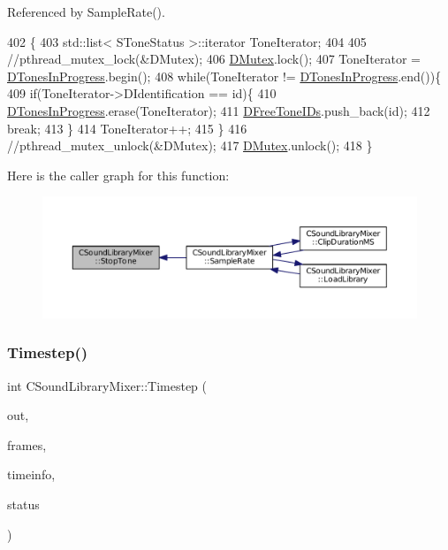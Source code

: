 Referenced by Sample\+Rate().


\begin{DoxyCode}
402                                        \{
403     std::list< SToneStatus >::iterator ToneIterator;
404     
405     \textcolor{comment}{//pthread\_mutex\_lock(&DMutex);}
406     \hyperlink{classCSoundLibraryMixer_a955562a0638df831413a1c6b8860f9fb}{DMutex}.lock();
407     ToneIterator = \hyperlink{classCSoundLibraryMixer_a39bb9c811d842a282b6b7058ac7dfe1c}{DTonesInProgress}.begin();
408     \textcolor{keywordflow}{while}(ToneIterator != \hyperlink{classCSoundLibraryMixer_a39bb9c811d842a282b6b7058ac7dfe1c}{DTonesInProgress}.end())\{
409         \textcolor{keywordflow}{if}(ToneIterator->DIdentification == \textcolor{keywordtype}{id})\{
410             \hyperlink{classCSoundLibraryMixer_a39bb9c811d842a282b6b7058ac7dfe1c}{DTonesInProgress}.erase(ToneIterator);
411             \hyperlink{classCSoundLibraryMixer_a2d1389368651db10fd6fd8b3cd08c164}{DFreeToneIDs}.push\_back(\textcolor{keywordtype}{id});
412             \textcolor{keywordflow}{break};
413         \}
414         ToneIterator++;
415     \}
416     \textcolor{comment}{//pthread\_mutex\_unlock(&DMutex);  }
417     \hyperlink{classCSoundLibraryMixer_a955562a0638df831413a1c6b8860f9fb}{DMutex}.unlock();
418 \}
\end{DoxyCode}
Here is the caller graph for this function\+:\nopagebreak
\begin{figure}[H]
\begin{center}
\leavevmode
\includegraphics[width=350pt]{classCSoundLibraryMixer_ab57bc3217de14130ed95c48223351ce3_icgraph}
\end{center}
\end{figure}
\hypertarget{classCSoundLibraryMixer_ad3ef0b67b77862e8c88949c3415095e7}{}\label{classCSoundLibraryMixer_ad3ef0b67b77862e8c88949c3415095e7} 
\subsubsection{\texorpdfstring{Timestep()}{Timestep()}}
{\footnotesize\ttfamily int C\+Sound\+Library\+Mixer\+::\+Timestep (\begin{DoxyParamCaption}\item[{void $\ast$}]{out,  }\item[{unsigned long}]{frames,  }\item[{const Pa\+Stream\+Callback\+Time\+Info $\ast$}]{timeinfo,  }\item[{Pa\+Stream\+Callback\+Flags}]{status }\end{DoxyParamCaption})}



